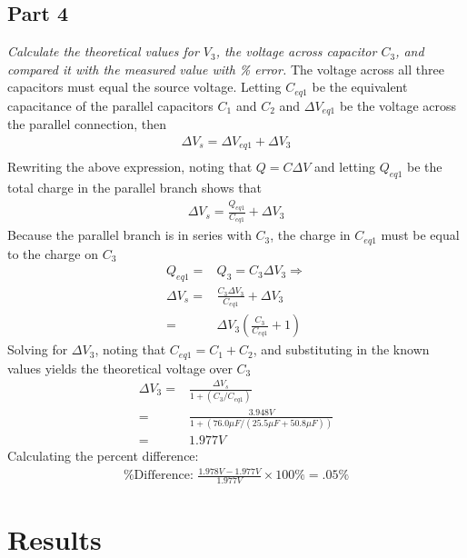 \documentclass[twocolumn,english]{IEEEtran}
\theoremstyle{plain}
\theoremstyle{plain}
\begin{document}
  \subsection*{\textbf{Part 4}}
  \textit{Calculate the theoretical values for $V_3$, the voltage across capacitor $C_3$, and compared it with the measured value with \% error.}
  The voltage across all three capacitors must equal the source voltage. Letting $C_{eq1}$ be the equivalent capacitance of the parallel capacitors $C_1$ and $C_2$ and $\Delta V_{eq1}$ be the voltage across the parallel connection, then
  \begin{align*}
   \Delta V_s = \Delta V_{eq1} + \Delta V_3 \\
  \end{align*}
  Rewriting the above expression, noting that $Q = C \Delta V$ and letting $Q_{eq1}$ be the total charge in the parallel branch shows that
  \begin{align*}
   \Delta V_s = \frac{Q_{eq1}}{C_{eq1}} + \Delta V_3
  \end{align*}
  Because the parallel branch is in series with $C_3$, the charge in $C_{eq1}$ must be equal to the charge on $C_3$
  \begin{align*}
   Q_{eq1} =& Q_3 = C_3 \Delta V_3 \Rightarrow \\
   \Delta V_s 	=& \frac{C_3 \Delta V_3}{C_{eq1}} + \Delta V_3 \\
		=& \Delta V_3 (\frac{C_3}{C_{eq1}} +1)
  \end{align*}
  Solving for $\Delta V_3$, noting that $C_{eq1} = C_1 + C_2$, and substituting in the known values yields the theoretical voltage over $C_3$
  \begin{align*}
   \Delta V_3 	=& \frac{\Delta V_s}{1 + (C_3 / C_{eq1})} \\
		=& \frac{3.948 V}{1 + (76.0 \mu F / (25.5 \mu F + 50.8 \mu F))} \\
		=& 1.977 V
  \end{align*}
  Calculating the percent difference:
  \begin{align*}
   \text{\% Difference: }\frac{1.978 V - 1.977 V }{1.977 V}\times 100\% = .05\%
  \end{align*}





\section{Results}
\end{document}
